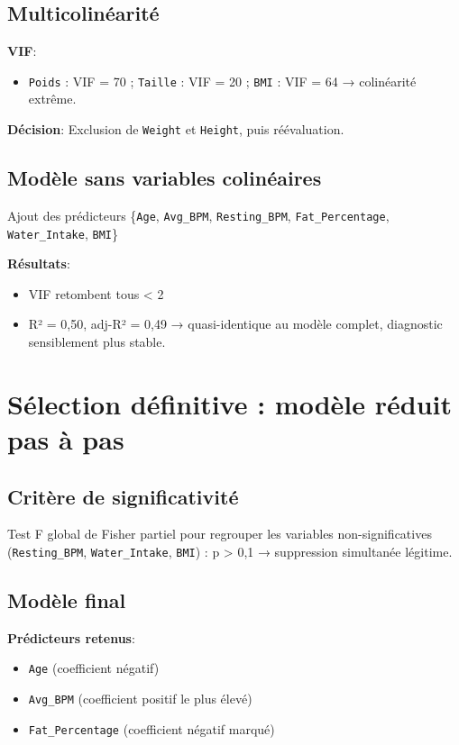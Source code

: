 \documentclass[12pt,a4paper]{article}
\begin{document}
\subsection{Multicolinéarité}
\textbf{VIF}:
\begin{itemize}
    \item \texttt{Poids} : VIF = 70 ; \texttt{Taille} : VIF = 20 ; \texttt{BMI} : VIF = 64 → colinéarité extrême.
\end{itemize}

\textbf{Décision}:
Exclusion de \texttt{Weight} et \texttt{Height}, puis réévaluation.

\subsection{Modèle sans variables colinéaires}
Ajout des prédicteurs \{\texttt{Age}, \texttt{Avg\_BPM}, \texttt{Resting\_BPM}, \texttt{Fat\_Percentage}, \texttt{Water\_Intake}, \texttt{BMI}\}

\textbf{Résultats}:
\begin{itemize}
    \item VIF retombent tous < 2
    \item R² = 0,50, adj-R² = 0,49 → quasi-identique au modèle complet, diagnostic sensiblement plus stable.
\end{itemize}

\section{Sélection définitive : modèle réduit pas à pas}

\subsection{Critère de significativité}
Test F global de Fisher partiel pour regrouper les variables non-significatives (\texttt{Resting\_BPM}, \texttt{Water\_Intake}, \texttt{BMI}) : p > 0,1 → suppression simultanée légitime.

\subsection{Modèle final}
\textbf{Prédicteurs retenus}:
\begin{itemize}
    \item \texttt{Age} (coefficient négatif)
    \item \texttt{Avg\_BPM} (coefficient positif le plus élevé)
    \item \texttt{Fat\_Percentage} (coefficient négatif marqué)
\end{itemize}
\end{document}
